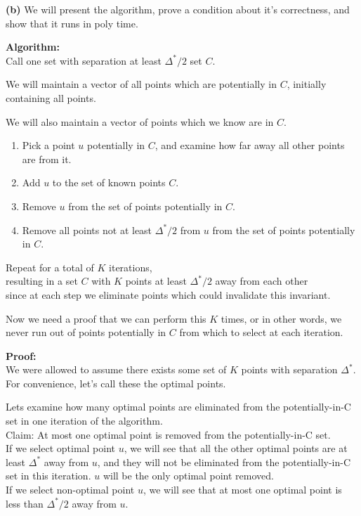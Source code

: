 \documentclass[11pt]{article}
\renewcommand{\part}[1] {\vspace{.10in} {\bf (#1)}}
\begin{document}
\part{b}
We will present the algorithm, prove a condition about it's correctness, and show that it runs in poly time.

\textbf{Algorithm:}\\
Call one set with separation at least $\Delta^{*} / 2$ set $C$.

We will maintain a vector of all points which are potentially in $C$, initially containing all points.

We will also maintain a vector of points which we know are in $C$.

\begin{enumerate}
\item Pick a point $u$ potentially in $C$, and examine how far away all other points are from it.
\item Add $u$ to the set of known points $C$.
\item Remove $u$ from the set of points potentially in $C$.
\item Remove all points not at least $\Delta^{*} / 2$ from $u$ from the set of points potentially in $C$.
\end{enumerate}

Repeat for a total of $K$ iterations,\\
resulting in a set $C$ with $K$ points at least $\Delta^{*} / 2$ away from each other\\
since at each step we eliminate points which could invalidate this invariant.

Now we need a proof that we can perform this $K$ times, or in other words, we never run out of points potentially in $C$ from which to select at each iteration.

\textbf{Proof:}\\
We were allowed to assume there exists some set of $K$ points with separation $\Delta^{*}$.\\
For convenience, let's call these the optimal points.

Lets examine how many optimal points are eliminated from the potentially-in-C set in one iteration of the algorithm.\\
Claim: At most one optimal point is removed from the potentially-in-C set.\\
If we select optimal point $u$, we will see that all the other optimal points are at least $\Delta^{*}$ away from $u$, and they will not be eliminated from the potentially-in-C set in this iteration. $u$ will be the only optimal point removed.\\
If we select non-optimal point $u$, we will see that at most one optimal point is less than $\Delta^{*} / 2$ away from $u$.
\end{document}
